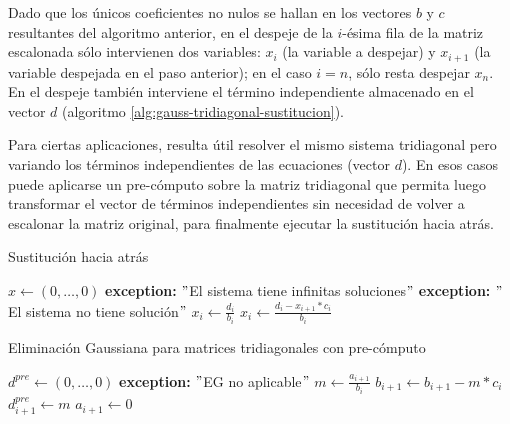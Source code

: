 Dado que los únicos coeficientes no nulos se hallan en los vectores $b$ y $c$ resultantes del algoritmo anterior, en el despeje de la $i$-ésima fila de la matriz escalonada sólo intervienen dos variables: $x_{i}$ (la variable a despejar) y $x_{i+1}$ (la variable despejada en el paso anterior); en el caso $i = n$, sólo resta despejar $x_{n}$. En el despeje también interviene el término independiente almacenado en el vector $d$ (algoritmo \ref{alg:gauss-tridiagonal-sustitucion}).

Para ciertas aplicaciones, resulta útil resolver el mismo sistema tridiagonal pero variando los términos independientes de las ecuaciones (vector $d$). En esos casos puede aplicarse un pre-cómputo sobre la matriz tridiagonal que permita luego transformar el vector de términos independientes sin necesidad de volver a escalonar la matriz original, para finalmente ejecutar la sustitución hacia atrás. 

\begin{algorithm}[H]
\caption{Sustitución hacia atrás}\label{alg:gauss-tridiagonal-sustitucion}
\begin{algorithmic}
   
\State $x \gets (0, \hdots, 0)$
                \State \textbf{exception:} $"$El sistema tiene infinitas soluciones$"$
            \Else \State \textbf{exception:} $"$El sistema no tiene solución$"$
            \EndIf
        \Else \State $x_{i} \gets \frac{d_{i}}{b_{i}} $
        \EndIf
    \Else
        \State $x_{i} \gets \frac{d_{i} - x_{i+1} * c_{i}}{b_{i}} $ 
    \EndIf
\EndFor
\end{algorithmic}
\end{algorithm}

\begin{algorithm}[H]
\caption{Eliminación Gaussiana para matrices tridiagonales con pre-cómputo}\label{alg:gauss-tridiagonal-con-precomputo}
\begin{algorithmic}
   
\State $d^{pre} \gets (0, \hdots, 0)$
     
        \State \textbf{exception:} $"$EG no aplicable$"$ 
    \Else
        \State $m \gets \frac{a_{i+1}}{b_{i}}$
        \State $b_{i+1} \gets b_{i+1} - m * c_{i}$
        \State $d^{pre}_{i+1} \gets m$
        \State $a_{i+1} \gets 0$
    \EndIf

\EndFor
\end{algorithmic}
\end{algorithm}

